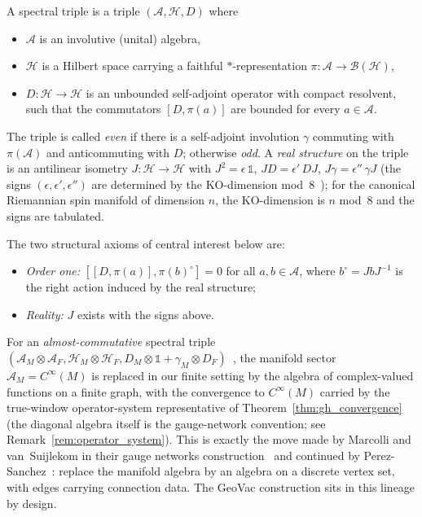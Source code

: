 \documentclass[11pt]{article}
\begin{document}
A spectral triple is a triple $(\mathcal{A}, \mathcal{H}, D)$
where~\cite{connes1995}
\begin{itemize}\setlength{\itemsep}{2pt}
\item $\mathcal{A}$ is an involutive (unital) algebra,
\item $\mathcal{H}$ is a Hilbert space carrying a faithful
$*$-representation $\pi: \mathcal{A} \to \mathcal{B}(\mathcal{H})$,
\item $D : \mathcal{H} \to \mathcal{H}$ is an unbounded self-adjoint
operator with compact resolvent, such that the commutators
$[D, \pi(a)]$ are bounded for every $a \in \mathcal{A}$.
\end{itemize}
The triple is called \emph{even} if there is a self-adjoint involution
$\gamma$ commuting with $\pi(\mathcal{A})$ and anticommuting with $D$;
otherwise \emph{odd}.  A \emph{real structure} on the triple is an
antilinear isometry $J: \mathcal{H} \to \mathcal{H}$ with
$J^2 = \epsilon\,\mathbb{1}$, $JD = \epsilon'\,DJ$,
$J\gamma = \epsilon''\,\gamma J$ (the signs $(\epsilon,\epsilon',
\epsilon'')$ are determined by the $\mathrm{KO}$-dimension
mod~$8$~\cite{connes1995}); for the canonical Riemannian spin
manifold of dimension $n$, the $\mathrm{KO}$-dimension is $n$ mod~$8$
and the signs are tabulated.

The two structural axioms of central interest below are:
\begin{itemize}
\item[(\textbf{O1})] \emph{Order one:} $[[D, \pi(a)], \pi(b)^{\circ}]
= 0$ for all $a, b \in \mathcal{A}$, where $b^{\circ} = JbJ^{-1}$ is
the right action induced by the real structure;
\item[(\textbf{R})] \emph{Reality:} $J$ exists with the signs above.
\end{itemize}

For an \emph{almost-commutative} spectral triple
$(\mathcal{A}_M \otimes \mathcal{A}_F, \mathcal{H}_M \otimes
\mathcal{H}_F, D_M \otimes \mathbb{1} + \gamma_M \otimes
D_F)$~\cite{vansuijlekom_book2015,chamseddine_connes1997_2008}, the
manifold sector $\mathcal{A}_M = C^{\infty}(M)$ is replaced in our
finite setting by the algebra of complex-valued functions on a finite
graph, with the convergence to $C^{\infty}(M)$ carried by the
true-window operator-system representative of
Theorem~\ref{thm:gh_convergence}
(the diagonal algebra itself is the gauge-network convention; see
Remark~\ref{rem:operator_system}).  This
is exactly the move made by Marcolli and van~Suijlekom in their gauge
networks construction~\cite{marcolli_vs2014} and continued by
Perez-Sanchez~\cite{perez_sanchez2025}: replace the
manifold algebra by an algebra on a discrete vertex set, with edges
carrying connection data.  The GeoVac construction sits in this
lineage by design.
\end{document}
